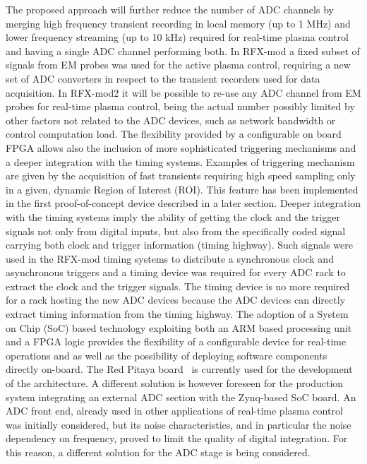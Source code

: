The proposed approach will further reduce the number of ADC channels by merging high frequency transient recording in local memory (up to 1 MHz) and lower frequency streaming (up to 10 kHz) required for real-time plasma control and having a single ADC channel performing both. In RFX-mod a fixed subset of signals from EM probes was used for the active plasma control, requiring a new set of ADC converters in respect to the transient recorders used for data acquisition. In RFX-mod2 it will be possible to re-use any ADC channel from EM probes for real-time plasma control, being the actual number possibly limited by other factors not related to the ADC devices, such as network bandwidth or control computation load. 
%
The flexibility provided by a configurable on board FPGA allows also the inclusion of more sophisticated triggering mechanisms and a deeper integration with the timing systems. Examples of triggering mechanism are given by the acquisition of fast transients requiring high speed sampling only in a given, dynamic Region of Interest (ROI). This feature has been implemented in the first proof-of-concept device described in a later section. Deeper integration with the timing systems imply the ability of getting the clock and the trigger signals not only from digital inputs, but also from the specifically coded signal carrying both clock and trigger information (timing highway)\cite{dio4}. Such signals were used in the RFX-mod timing systems to distribute a synchronous clock and asynchronous triggers and a timing device was required for every ADC rack to extract the clock and the trigger signals. The timing device is no more required for a rack hosting the new ADC devices because the ADC devices can directly extract timing information from the timing highway.  
%
The adoption of a System on Chip (SoC) based technology exploiting both an ARM based processing unit and a FPGA logic provides the  flexibility of a configurable device for real-time operations and as well as the possibility of deploying software components directly on-board. The Red Pitaya board~\cite{redpitaya} is currently used for the development of the architecture. A different solution is however foreseen for the production system integrating an external ADC section with the Zynq-based SoC board. An ADC front end, already used in other applications of real-time plasma control~\cite{ATCA-MIMO-ISOL} was initially considered, but its noise characteristics, and in particular the noise dependency on frequency, proved to limit the quality of digital integration. For this reason, a different solution for the ADC stage is being considered.

